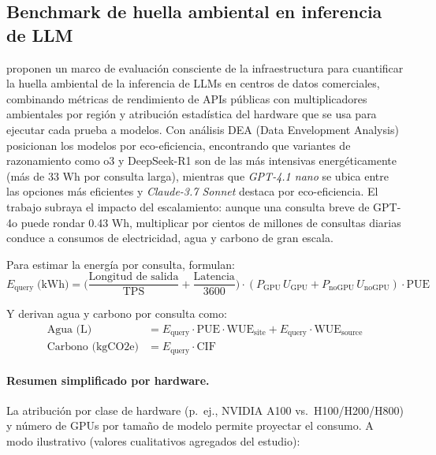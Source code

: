\subsection{Benchmark de huella ambiental en inferencia de LLM}

\textcite{jegham2025hungry} proponen un marco de evaluación consciente de la infraestructura para cuantificar la huella ambiental de la inferencia de LLMs en centros de datos comerciales, combinando métricas de rendimiento de APIs públicas con multiplicadores ambientales por región y atribución estadística del hardware que se usa para ejecutar cada prueba a modelos. Con análisis DEA (Data Envelopment Analysis) posicionan los modelos por eco-eficiencia, encontrando que variantes de razonamiento como o3 y DeepSeek-R1 son de las más intensivas energéticamente (más de 33 Wh por consulta larga), mientras que \emph{GPT-4.1 nano} se ubica entre las opciones más eficientes y \emph{Claude-3.7 Sonnet} destaca por eco-eficiencia. El trabajo subraya el impacto del escalamiento: aunque una consulta breve de GPT-4o puede rondar 0.43 Wh, multiplicar por cientos de millones de consultas diarias conduce a consumos de electricidad, agua y carbono de gran escala.

Para estimar la energía por consulta, formulan:
\begin{equation}
E_{\text{query}}\;\text{(kWh)} = \Big( \frac{\text{Longitud de salida}}{\text{TPS}} + \frac{\text{Latencia}}{3600} \Big) \cdot ( P_{\text{GPU}}\,U_{\text{GPU}} + P_{\text{noGPU}}\,U_{\text{noGPU}} ) \cdot \text{PUE}
\end{equation}

Y derivan agua y carbono por consulta como:
\begin{align}
\text{Agua (L)} &= E_{\text{query}}\cdot \text{PUE} \cdot \text{WUE}_{\text{site}} + E_{\text{query}} \cdot \text{WUE}_{\text{source}} \\
\text{Carbono (kgCO2e)} &= E_{\text{query}} \cdot \text{CIF}
\end{align}

\paragraph{Resumen simplificado por hardware.}
La atribución por clase de hardware (p.\ ej., NVIDIA A100 vs.\ H100/H200/H800) y número de GPUs por tamaño de modelo permite proyectar el consumo. A modo ilustrativo (valores cualitativos agregados del estudio):

